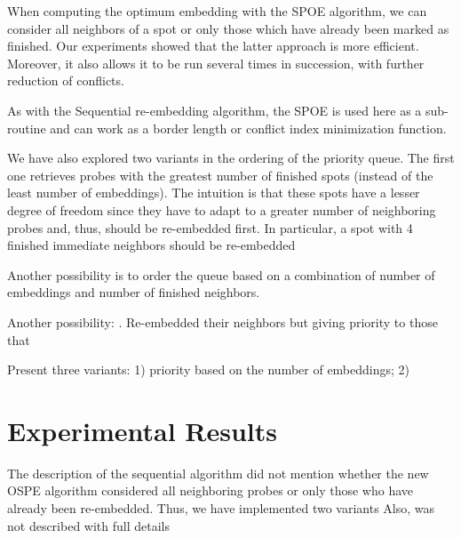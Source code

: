 \documentclass{llncs}
\begin{document}
When computing the optimum embedding with the SPOE algorithm, we can consider all neighbors of a spot or only those which have already been marked as finished. Our experiments showed that the latter approach is more efficient. Moreover, it also allows it to be run several times in succession, with further reduction of conflicts.

As with the Sequential re-embedding algorithm, the SPOE is used here as a sub-routine and can work as a border length or conflict index minimization function.

We have also explored two variants in the ordering of the priority queue. The first one retrieves probes with the greatest number of finished spots (instead of the least number of embeddings). The intuition is that these spots have a lesser degree of freedom since they have to adapt to a greater number of neighboring probes and, thus, should be re-embedded first. In particular, a spot with 4 finished immediate neighbors should be re-embedded 

Another possibility is to order the queue based on a combination of number of embeddings and number of finished neighbors. 

Another possibility: . Re-embedded their neighbors but giving priority to those that 

Present three variants: 1) priority based on the number of embeddings; 2) 

\section{Experimental Results}

The description of the sequential algorithm did not mention whether the new OSPE algorithm considered all neighboring probes or only those who have already been re-embedded. Thus, we have implemented two variants Also, was not described with full details

\footnotesize
\end{document}
